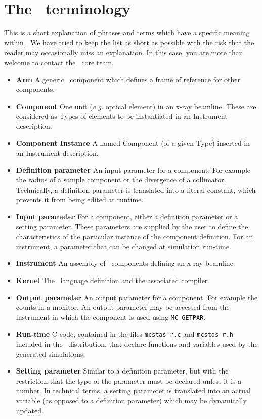 
\chapter{The \MCX\ terminology}
\label{s:terminology}

This is a short explanation of phrases and terms which have a specific
meaning within \MCX. We have tried to keep the list as short
as possible with the risk that the reader may occasionally miss
an explanation. In this case, you are more than welcome to contact
the \MCX\ core team.

\noindent
\begin{itemize}
\item{\bfseries Arm}  A generic \MCX\ component which defines a frame of reference
      for other components.
\item{\bfseries Component} One unit ({\em e.g.} optical element) in an x-ray beamline. These are considered as Types of elements to be instantiated in an Instrument description.
\item{\bfseries Component Instance} A named Component (of a given Type) inserted in an Instrument description.
\item{\bfseries Definition parameter} An input parameter for a component. For
  example the radius of a sample component or the divergence of a collimator. Technically, a definition parameter 
  is translated into a literal constant, which prevents it from being edited at runtime. 
\item{\bfseries Input parameter} For a component, either a definition parameter
or a setting parameter. These parameters are supplied by the user to
define the characteristics of the particular instance of the component
definition. For an instrument, a parameter that can be changed at
simulation run-time.
\item{\bfseries Instrument} An assembly of \MCX\ components defining
      an x-ray beamline.
\item{\bfseries Kernel} The \MCX\ language definition and the associated compiler
\item{\bfseries Output parameter} An output parameter for a component.
  For example the counts in a monitor. An output parameter may be
  accessed from the instrument in which the component is used using
  \verb`MC_GETPAR`.
\item{\bfseries Run-time} C code, contained in the files
  \verb+mcstas-r.c+ and \verb+mcstas-r.h+ included in the \MCX\
  distribution, that declare functions and variables used by the
  generated simulations.
\item{\bfseries Setting parameter} Similar to a definition parameter, but with the
  restriction that the type of the parameter must be declared unless it is a number. In technical terms, 
  a setting parameter is translated into an actual variable (as opposed to a definition parameter) which 
  may be dynamically updated.
\end{itemize}
